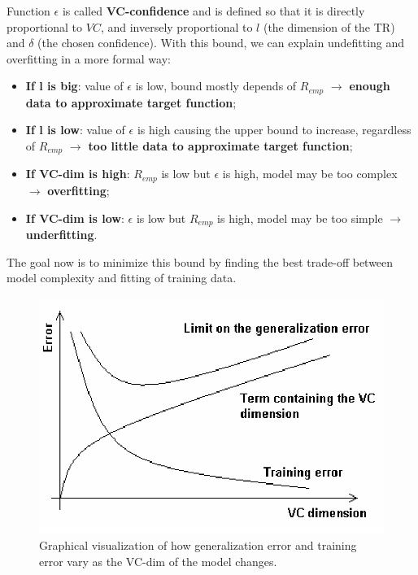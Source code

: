 \begin{center}
\end{center}

Function $\epsilon$ is called \textbf{VC-confidence} and is defined so that it is directly proportional to $VC$, and inversely proportional to $l$ (the dimension of the TR) and $\delta$ (the chosen confidence). With this bound, we can explain undefitting and overfitting in a more formal way:

\begin{itemize}
    \item \textbf{If l is big}: value of $\epsilon$ is low, bound mostly depends of $R_{emp}$ $\xrightarrow{}$ \textbf{enough data to approximate target function};

    \item \textbf{If l is low}: value of $\epsilon$ is high causing the upper bound to increase, regardless of $R_{emp}$ $\xrightarrow{}$ \textbf{too little data to approximate target function};

    \item \textbf{If VC-dim is high}: $R_{emp}$ is low but $\epsilon$ is high, model may be too complex $\xrightarrow{}$ \textbf{overfitting};

    \item \textbf{If VC-dim is low}: $\epsilon$ is low but $R_{emp}$ is high, model may be too simple $\xrightarrow{}$ \textbf{underfitting}.
\end{itemize}
The goal now is to minimize this bound by finding the best trade-off between model complexity and fitting of training data.

\begin{figure}[h]
    \centering
    \includegraphics[width=0.5\linewidth]{img/Illustration-of-the-Structural-Risk-Minimization-Principle.png}
    \caption{Graphical visualization of how generalization error and training error vary as the VC-dim of the model changes.}
\end{figure}

